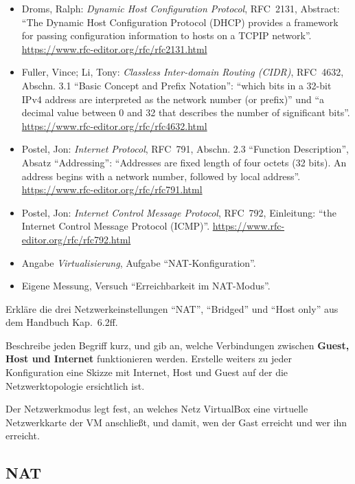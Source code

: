\begin{itemize}[quellen]
  \item Droms, Ralph: \emph{Dynamic Host Configuration Protocol}, RFC~2131, Abstract: \enquote{The Dynamic Host Configuration Protocol (DHCP) provides a framework for passing configuration information to hosts on a TCPIP network}. \url{https://www.rfc-editor.org/rfc/rfc2131.html}
  \item Fuller, Vince; Li, Tony: \emph{Classless Inter-domain Routing (CIDR)}, RFC~4632, Abschn. 3.1 \enquote{Basic Concept and Prefix Notation}: \enquote{which bits in a 32-bit IPv4 address are interpreted as the network number (or prefix)} und \enquote{a decimal value between 0 and 32 that describes the number of significant bits}. \url{https://www.rfc-editor.org/rfc/rfc4632.html}
  \item Postel, Jon: \emph{Internet Protocol}, RFC~791, Abschn. 2.3 \enquote{Function Description}, Absatz \enquote{Addressing}: \enquote{Addresses are fixed length of four octets (32 bits). An address begins with a network number, followed by local address}. \url{https://www.rfc-editor.org/rfc/rfc791.html}
  \item Postel, Jon: \emph{Internet Control Message Protocol}, RFC~792, Einleitung: \enquote{the Internet Control Message Protocol (ICMP)}. \url{https://www.rfc-editor.org/rfc/rfc792.html}
  \item Angabe \emph{Virtualisierung}, Aufgabe \enquote{NAT-Konfiguration}.
  \item Eigene Messung, Versuch \enquote{Erreichbarkeit im NAT-Modus}.
\end{itemize}

\begin{aufgabe}
Erkläre die drei Netzwerkeinstellungen \enquote{NAT}, \enquote{Bridged} und \enquote{Host only} aus dem Handbuch Kap.~6.2ff.

Beschreibe jeden Begriff kurz, und gib an, welche Verbindungen zwischen \textbf{Guest, Host und Internet} funktionieren werden. Erstelle weiters zu jeder Konfiguration eine Skizze mit Internet, Host und Guest auf der die Netzwerktopologie ersichtlich ist.
\end{aufgabe}
\label{sec:netzwerkmodi}

Der Netzwerkmodus legt fest, an welches Netz VirtualBox eine virtuelle Netzwerkkarte der VM anschließt, und damit, wen der Gast erreicht und wer ihn erreicht.

\subsection{NAT}
\label{sec:modus-nat}

